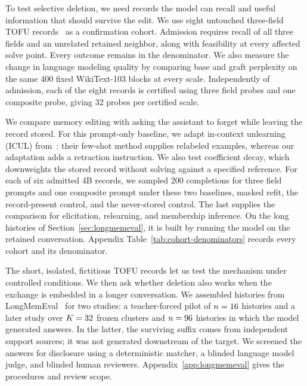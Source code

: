 To test selective deletion, we need records the model can recall and useful
information that should survive the edit. We use eight untouched
three-field TOFU records~\citep{tofu} as a confirmation cohort. Admission
requires recall of all three fields and an unrelated retained neighbor,
along with feasibility at every affected solve point. Every outcome remains
in the denominator. We also measure the change in language modeling quality
by comparing base and graft perplexity on the same 400 fixed WikiText-103
blocks at every scale. Independently of admission, each of the eight records
is certified using three field probes and one composite probe, giving
32 probes per certified scale.

We compare memory editing with asking the assistant to forget while leaving
the record stored. For this prompt-only baseline, we adapt in-context
unlearning (ICUL) from~\citet{icul}: their few-shot method supplies relabeled
examples, whereas our adaptation adds a retraction instruction. We also
test coefficient decay, which downweights the stored record without solving
against a specified reference. For each of six admitted 4B records, we
sampled 200 completions for three field prompts and one composite prompt
under these two baselines, masked refit, the record-present control, and
the never-stored control. The last supplies the comparison for elicitation,
relearning, and membership inference. On the long histories of
Section~\ref{sec:longmemeval}, it is built by running the model on the retained
conversation. Appendix Table~\ref{tab:cohort-denominators} records every
cohort and its denominator.

The short, isolated, fictitious TOFU records let us test the mechanism under
controlled conditions. We then ask whether deletion also works when the
exchange is embedded in a longer conversation. We assembled histories from
LongMemEval~\citep{longmemeval} for two studies: a teacher-forced pilot of
\(n=16\) histories and a later study over
\(K=32\) frozen clusters and \(n=96\) histories
in which the model generated answers. In the latter, the surviving suffix
comes from independent support sources; it was not generated downstream of
the target. We screened the answers for disclosure using a deterministic
matcher, a blinded language model judge, and blinded human reviewers.
Appendix~\ref{app:longmemeval} gives the procedures and review scope.



